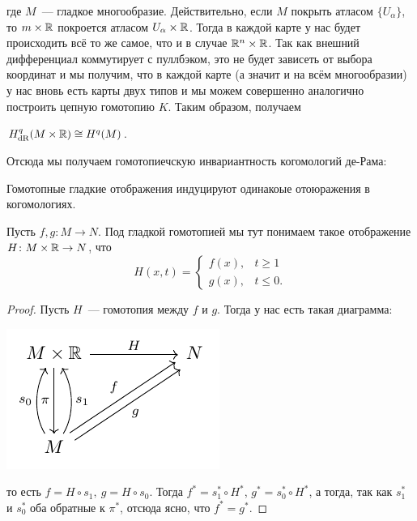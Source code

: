  		 где $M$~--- гладкое многообразие. Действительно, если $M$ покрыть атласом $\{ U_{\alpha} \}$, то $m \times \mathbb{R}$ покроется атласом $U_{\alpha} \times \mathbb{R}$. Тогда в каждой карте у нас будет происходить всё то же самое, что и в случае $\mathbb{R}^n \times \mathbb{R}$. Так как внешний дифференциал коммутирует с пуллбэком, это не будет зависеть от выбора координат и мы получим, что в каждой карте (а значит и на всём многообразии)  у нас вновь есть карты двух типов и мы можем совершенно аналогично построить цепную гомотопию $K$. Таким образом, получаем 

 		 \begin{corollary}
 		 	$H^{q}_{\operatorname{dR}}(M \times \mathbb{R}) \cong H^{q}(M)$. 
 		 \end{corollary}

 		 Отсюда мы получаем гомотопиечскую инвариантность когомологий де-Рама:

 		 \begin{corollary}
 		  	Гомотопные гладкие отображения индуцируют одинакоые отоюражения в когомологиях.
 		  \end{corollary} 
 		  \begin{remark}
 		  	Пусть $f, g \colon M \to N$. Под гладкой гомотопией мы тут понимаем такое отображение $H\colon M \times \mathbb{R} \to N$, что 
 		  	\[
 		  		H(x, t) = \begin{cases} f(x), & t \ge 1 \\ g(x), & t \le 0. \end{cases}
 		  	\]
 		  \end{remark}
 		  \begin{proof}
 		  		Пусть $H$~--- гомотопия между $f$ и $g$. Тогда у нас есть такая диаграмма: 

 		  		\begin{center}
 		  			\includegraphics{lectures/7/pictures/cd_14.pdf}
 		  		\end{center}
 		  		то есть $f = H \circ s_1, \ g = H \circ s_0$. Тогда $f^* = s_1^* \circ H^*$, $g^* = s_0^* \circ H^*$, а тогда, так как $s_1^*$ и $s_0^*$ оба обратные к $\pi^*$, отсюда ясно, что $f^* = g^*$. 
 		  \end{proof}


